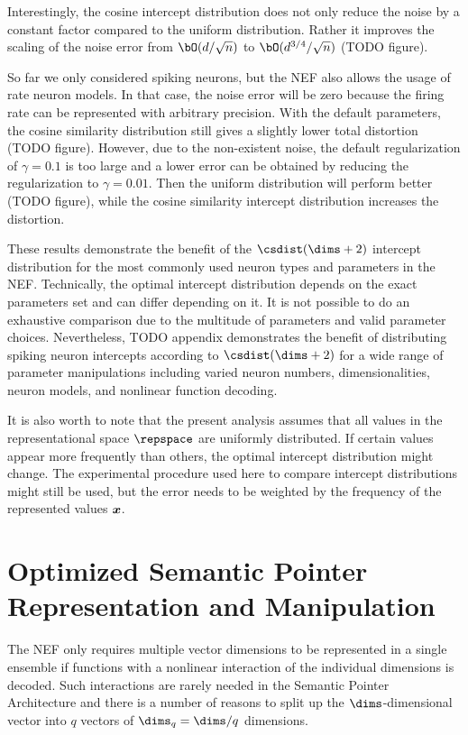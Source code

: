 Interestingly, the cosine intercept distribution does not only reduce the noise by a constant factor compared to the uniform distribution.
Rather it improves the scaling of the noise error from $\bO(d/\sqrt{n})$ to $\bO(d^{3/4}/\sqrt{n})$ (TODO figure).

So far we only considered spiking neurons, but the NEF also allows the usage of rate neuron models.
In that case, the noise error will be zero because the firing rate can be represented with arbitrary precision.
With the default parameters, the cosine similarity distribution still gives a slightly lower total distortion (TODO figure).
However, due to the non-existent noise, the default regularization of $\gamma = 0.1$ is too large and a lower error can be obtained by reducing the regularization to $\gamma = 0.01$.
Then the uniform distribution will perform better (TODO figure), while the cosine similarity intercept distribution increases the distortion.

These results demonstrate the benefit of the $\csdist(\dims + 2)$ intercept distribution for the most commonly used neuron types and parameters in the NEF.
Technically, the optimal intercept distribution depends on the exact parameters set and can differ depending on it.
It is not possible to do an exhaustive comparison due to the multitude of parameters and valid parameter choices.
Nevertheless, TODO appendix demonstrates the benefit of distributing spiking neuron intercepts according to $\csdist(\dims + 2)$ for a wide range of parameter manipulations including varied neuron numbers, dimensionalities, neuron models, and nonlinear function decoding.

It is also worth to note that the present analysis assumes that all values in the representational space $\repspace$ are uniformly distributed.
If certain values appear more frequently than others, the optimal intercept distribution might change.
The experimental procedure used here to compare intercept distributions might still be used, but the error needs to be weighted by the frequency of the represented values $\bm{x}$.


\section{Optimized Semantic Pointer Representation and Manipulation}
The NEF only requires multiple vector dimensions to be represented in a single ensemble if functions with a nonlinear interaction of the individual dimensions is decoded.
Such interactions are rarely needed in the Semantic Pointer Architecture and there is a number of reasons to split up the $\dims$-dimensional vector into $q$ vectors of $\dims_q = \dims / q$ dimensions.

